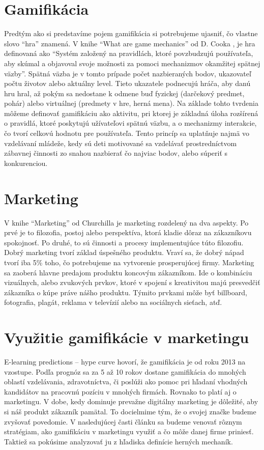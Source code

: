 \documentclass[10pt,twoside,slovak,a4paper]{article}
\begin{document}
\section{Gamifikácia}\label{gamifikacia}
	Predtým ako si predstavíme pojem gamifikácia si potrebujeme ujasniť, čo vlastne slovo “hra” znamená. V knihe “What are game mechanics”  od D. Cooka \cite{WhatAreGameMechanics}, je hra definovaná ako “Systém založený na pravidlách, ktoré povzbudzujú používateľa, aby skúmal a objavoval svoje možnosti za pomoci mechanizmov okamžitej spätnej väzby”. Spätná väzba je v tomto prípade počet nazbieraných bodov, ukazovateľ počtu životov alebo aktuálny level. Tieto ukazatele podnecujú hráča, aby danú hru hral, až pokým sa nedostane k odmene buď fyzickej (darčekový predmet, pohár) alebo virtuálnej (predmety v hre, herná mena). 
	Na základe tohto tvrdenia môžeme definovať gamifikáciu ako aktivitu, pri ktorej je základná úloha rozšírená o pravidlá, ktoré poskytujú užívateľovi spätnú väzbu, a o mechanizmy interakcie, čo tvorí celkovú hodnotu pre používateľa. Tento princíp sa uplatňuje najmä vo vzdelávaní mládeže, kedy sú deti motivované sa vzdelávať prostredníctvom zábavnej činnosti zo snahou nazbierať čo najviac bodov, alebo súperiť s konkurenciou.



\section{Marketing}\label{marketing}

	V knihe “Marketing” od Churchilla je marketing rozdelený na dva aspekty. \cite{churchill2017marketing}Po prvé je to filozofia, postoj alebo perspektíva, ktorá kladie dôraz na zákazníkovu spokojnosť. Po druhé, to sú činnosti a procesy implementujúce túto filozofiu.
	Dobrý marketing tvorí základ úspešného produktu. Vraví sa, že dobrý nápad tvorí iba 5\% toho, čo potrebujeme na vytvorenie prosperujúcej firmy. Marketing sa zaoberá hlavne predajom produktu koncovým zákazníkom. Ide o kombináciu vizuálnych, alebo zvukových prvkov, ktoré v spojení s kreativitou majú presvedčiť zákazníka o kúpe práve nášho produktu. Týmito prvkami môže byť billboard, fotografia, plagát, reklama v televízií alebo na sociálnych sieťach, atď.


\section{Využitie gamifikácie v marketingu}\label{pouzitie-v-marketingu}
E-learning predictions – hype curve
\cite{eLearningPredictions} hovorí, že gamifikácia je od roku 2013 na vzostupe. Podľa prognóz sa za 5 až 10 rokov dostane gamifikácia do mnohých oblastí vzdelávania, zdravotníctva, či poslúži ako pomoc pri hľadaní vhodných kandidátov na pracovnú pozíciu v mnohých firmách.
Rovnako to platí aj o marketingu. V dobe, kedy dominuje prevažne digitálny marketing je dôležité, aby si náš produkt zákazník pamätal. To docielmime tým, že o svojej značke budeme zvyšovať povedomie. V nasledujúcej časti článku sa budeme venovať rôznym stratégiam, ako gamifikáciu v marketingu využiť a čo môže danej firme priniesť. Taktiež sa pokúsime analyzovať ju z hľadiska definície herných mechaník.
\end{document}
